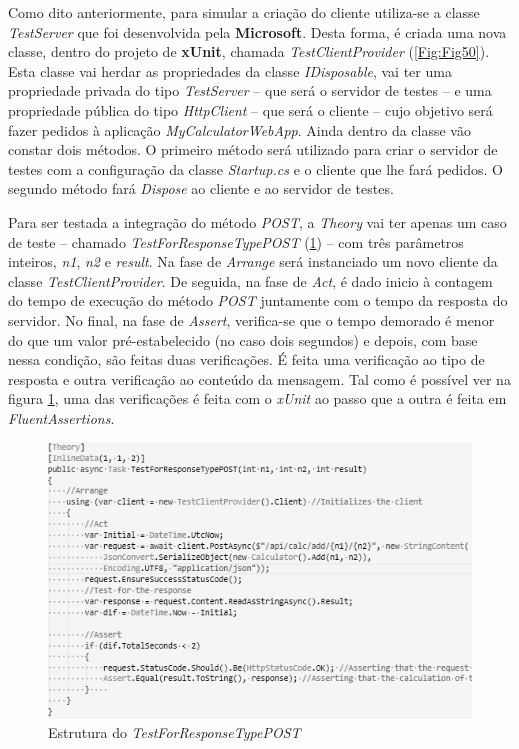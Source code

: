 \hspace{1cm}Como dito anteriormente, para simular a criação do cliente utiliza-se a classe \textit{TestServer} que foi desenvolvida pela \textbf{Microsoft}. Desta forma, é criada uma nova classe, dentro do projeto de \textbf{xUnit}, chamada \textit{TestClientProvider} (\ref{Fig:Fig50}). Esta classe vai herdar as propriedades da classe \textit{IDisposable}, vai ter uma propriedade privada do tipo \textit{TestServer} -- que será o  servidor de testes -- e uma propriedade pública do tipo \textit{HttpClient} -- que será o cliente -- cujo objetivo será fazer pedidos à aplicação \textit{MyCalculatorWebApp}. Ainda dentro da classe vão constar dois métodos. O primeiro método será utilizado para criar o servidor de testes com a configuração da classe \textit{Startup.cs} e o cliente que lhe fará pedidos. O segundo método fará \textit{Dispose} ao cliente e ao servidor de testes.



\hspace{1cm}Para ser testada a integração do método \textit{POST}, a \textit{Theory} vai ter apenas um caso de teste -- chamado \textit{TestForResponseTypePOST} (\ref{Fig:Fig51}) -- com três parâmetros inteiros, \textit{n1}, \textit{n2} e \textit{result}. Na fase de \textit{Arrange} será instanciado um novo cliente da classe \textit{TestClientProvider}. De seguida, na fase de \textit{Act}, é dado inicio à contagem do tempo de execução do método \textit{POST} juntamente com o tempo da resposta do servidor. No final, na fase de \textit{Assert}, verifica-se que o tempo demorado é menor do que um valor pré-estabelecido (no caso dois segundos) e depois, com base nessa condição, são feitas duas verificações. É feita uma verificação ao tipo de resposta e outra verificação ao conteúdo da mensagem. Tal como é possível ver na figura \ref{Fig:Fig51}, uma das verificações é feita com o \textit{xUnit} ao passo que a outra é feita em \textit{FluentAssertions}.

\begin{figure}[hbt!]
\centering
\includegraphics[width=0.7\linewidth]{Cap5/VSIntegrationTest.png}
\caption{Estrutura do \textit{TestForResponseTypePOST}}
\label{Fig:Fig51}
\end{figure}

